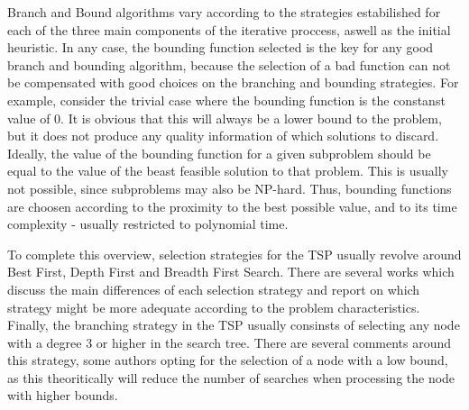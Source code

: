 Branch and Bound algorithms vary according to the strategies estabilished for each of the three main components of the iterative proccess,
aswell as the initial heuristic. In any case, the bounding function selected is the key for any good branch and bounding algorithm,
because the selection of a bad function can not be compensated with good choices on the branching and bounding strategies.
For example, consider the trivial case where the bounding function is the constanst value of 0. It is obvious that this will always be a lower bound 
to the problem, but it does not produce any quality information of which solutions to discard.
Ideally, the value of the bounding function for a given subproblem should be equal to the value of the beast feasible solution 
to that problem. This is usually not possible, since subproblems may also be NP-hard. 
Thus, bounding functions are choosen according to the proximity to the best possible value, and to its time complexity - usually restricted to polynomial time.

To complete this overview, selection strategies for the TSP usually revolve around Best First, Depth First and Breadth First Search.
There are several works which discuss the main differences of each selection strategy and report on which strategy might be more adequate according to the problem characteristics.
Finally, the branching strategy in the TSP usually consinsts of selecting any node with a degree 3 or higher in the search tree.
There are several comments around this strategy, some authors opting for the selection of a node with a low bound,
as this theoritically will reduce the number of searches when processing the node with higher bounds.



